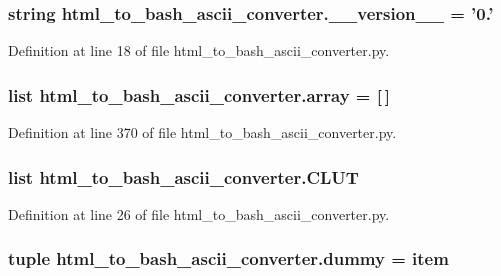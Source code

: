 \subsubsection[{\-\_\-\-\_\-version\-\_\-\-\_\-}]{\setlength{\rightskip}{0pt plus 5cm}string html\-\_\-to\-\_\-bash\-\_\-ascii\-\_\-converter.\-\_\-\-\_\-version\-\_\-\-\_\- = '0.'}\label{namespacehtml__to__bash__ascii__converter_a937fe091f7f5049b61c912d08f211cd7}


Definition at line 18 of file html\-\_\-to\-\_\-bash\-\_\-ascii\-\_\-converter.\-py.

\subsubsection[{array}]{\setlength{\rightskip}{0pt plus 5cm}list html\-\_\-to\-\_\-bash\-\_\-ascii\-\_\-converter.\-array = \mbox{[}$\,$\mbox{]}}\label{namespacehtml__to__bash__ascii__converter_ad57a10a30c2373374b5b77aee25d400f}


Definition at line 370 of file html\-\_\-to\-\_\-bash\-\_\-ascii\-\_\-converter.\-py.

\subsubsection[{C\-L\-U\-T}]{\setlength{\rightskip}{0pt plus 5cm}list html\-\_\-to\-\_\-bash\-\_\-ascii\-\_\-converter.\-C\-L\-U\-T}\label{namespacehtml__to__bash__ascii__converter_aca623d307673341a5040390d44ab99ba}


Definition at line 26 of file html\-\_\-to\-\_\-bash\-\_\-ascii\-\_\-converter.\-py.

\subsubsection[{dummy}]{\setlength{\rightskip}{0pt plus 5cm}tuple html\-\_\-to\-\_\-bash\-\_\-ascii\-\_\-converter.\-dummy = item}\label{namespacehtml__to__bash__ascii__converter_a96e43cec76ccd1749dad1dfff3033b3a}


